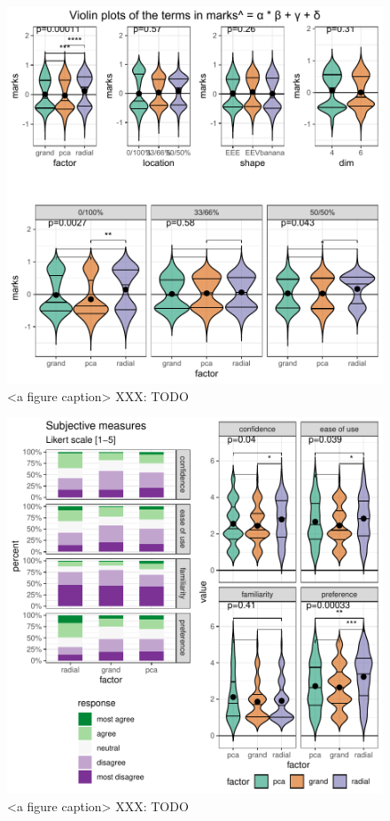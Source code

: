 \documentclass{monashthesis}
\begin{document}
\begin{figure}

{\centering \includegraphics[width=1\linewidth,]{./figures_from_script/ch4_fig5_ABcd_violins} 

}

\caption{<a figure caption> XXX: TODO}\label{fig:ch4fig5}
\end{figure}

\begin{figure}

{\centering \includegraphics[width=1\linewidth,]{./figures_from_script/ch4_fig6_subjective_measures} 

}

\caption{<a figure caption> XXX: TODO}\label{fig:ch4fig6}
\end{figure}

\printbibliography[heading=bibintoc]
\end{document}

